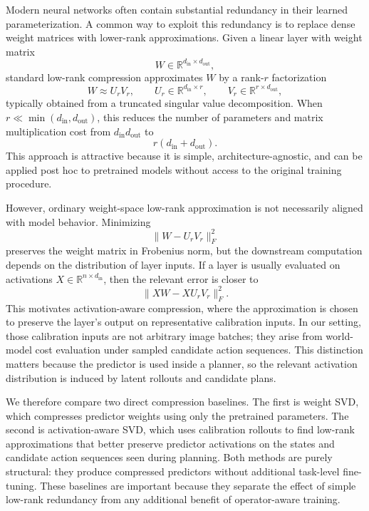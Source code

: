 \documentclass[11pt]{article}
\begin{document}
Modern neural networks often contain substantial redundancy in their learned parameterization. A common way to exploit this redundancy is to replace dense weight matrices with lower-rank approximations. Given a linear layer with weight matrix
\[
    W \in \mathbb{R}^{d_{\mathrm{in}} \times d_{\mathrm{out}}},
\]
standard low-rank compression approximates $W$ by a rank-$r$ factorization
\[
    W \approx U_r V_r,
    \qquad
    U_r \in \mathbb{R}^{d_{\mathrm{in}} \times r},
    \qquad
    V_r \in \mathbb{R}^{r \times d_{\mathrm{out}}},
\]
typically obtained from a truncated singular value decomposition. When $r \ll \min(d_{\mathrm{in}}, d_{\mathrm{out}})$, this reduces the number of parameters and matrix multiplication cost from $d_{\mathrm{in}}d_{\mathrm{out}}$ to
\[
    r(d_{\mathrm{in}} + d_{\mathrm{out}}).
\]
This approach is attractive because it is simple, architecture-agnostic, and can be applied post hoc to pretrained models without access to the original training procedure.

However, ordinary weight-space low-rank approximation is not necessarily aligned with model behavior. Minimizing
\[
    \lVert W - U_r V_r \rVert_F^2
\]
preserves the weight matrix in Frobenius norm, but the downstream computation depends on the distribution of layer inputs. If a layer is usually evaluated on activations $X \in \mathbb{R}^{n \times d_{\mathrm{in}}}$, then the relevant error is closer to
\[
    \lVert XW - XU_rV_r \rVert_F^2.
\]
This motivates activation-aware compression, where the approximation is chosen to preserve the layer's output on representative calibration inputs. In our setting, those calibration inputs are not arbitrary image batches; they arise from world-model cost evaluation under sampled candidate action sequences. This distinction matters because the predictor is used inside a planner, so the relevant activation distribution is induced by latent rollouts and candidate plans.

We therefore compare two direct compression baselines. The first is weight SVD, which compresses predictor weights using only the pretrained parameters. The second is activation-aware SVD, which uses calibration rollouts to find low-rank approximations that better preserve predictor activations on the states and candidate action sequences seen during planning. Both methods are purely structural: they produce compressed predictors without additional task-level fine-tuning. These baselines are important because they separate the effect of simple low-rank redundancy from any additional benefit of operator-aware training.
\end{document}
